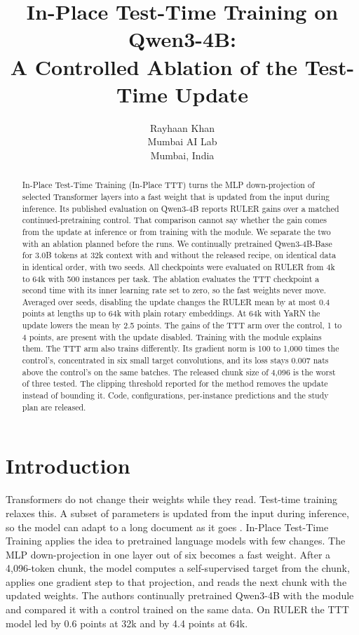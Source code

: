 \documentclass{article}
\title{In-Place Test-Time Training on Qwen3-4B:\\A Controlled Ablation of the Test-Time Update}
\author{Rayhaan Khan \\
Mumbai AI Lab \\
Mumbai, India}
\begin{document}
\maketitle

\begin{abstract}
In-Place Test-Time Training (In-Place TTT) turns the MLP down-projection of selected Transformer layers into a fast weight that is updated from the input during inference. Its published evaluation on Qwen3-4B reports RULER gains over a matched continued-pretraining control. That comparison cannot say whether the gain comes from the update at inference or from training with the module. We separate the two with an ablation planned before the runs. We continually pretrained Qwen3-4B-Base for 3.0B tokens at 32k context with and without the released recipe, on identical data in identical order, with two seeds. All checkpoints were evaluated on RULER from 4k to 64k with 500 instances per task. The ablation evaluates the TTT checkpoint a second time with its inner learning rate set to zero, so the fast weights never move. Averaged over seeds, disabling the update changes the RULER mean by at most 0.4 points at lengths up to 64k with plain rotary embeddings. At 64k with YaRN the update lowers the mean by 2.5 points. The gains of the TTT arm over the control, 1 to 4 points, are present with the update disabled. Training with the module explains them. The TTT arm also trains differently. Its gradient norm is 100 to 1,000 times the control's, concentrated in six small target convolutions, and its loss stays 0.007 nats above the control's on the same batches. The released chunk size of 4,096 is the worst of three tested. The clipping threshold reported for the method removes the update instead of bounding it. Code, configurations, per-instance predictions and the study plan are released.
\end{abstract}

\section{Introduction}

Transformers do not change their weights while they read. Test-time training relaxes this. A subset of parameters is updated from the input during inference, so the model can adapt to a long document as it goes \citep{sun2020ttt, hardt2023nearest, sun2024ttt}. In-Place Test-Time Training \citep{feng2026inplace} applies the idea to pretrained language models with few changes. The MLP down-projection in one layer out of six becomes a fast weight. After a 4,096-token chunk, the model computes a self-supervised target from the chunk, applies one gradient step to that projection, and reads the next chunk with the updated weights. The authors continually pretrained Qwen3-4B with the module and compared it with a control trained on the same data. On RULER \citep{hsieh2024ruler} the TTT model led by 0.6 points at 32k and by 4.4 points at 64k.
\end{document}
